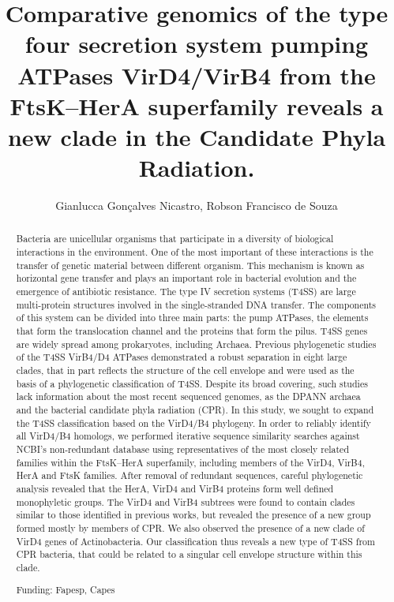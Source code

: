 \documentclass[twoside]{article}
\title{\vspace{-15mm}\fontsize{24pt}{10pt}\selectfont\textbf{ Comparative genomics of the type four secretion system pumping ATPases VirD4/VirB4 from the FtsK–HerA superfamily reveals a new clade in the Candidate Phyla Radiation. }} %
\author{ Gianlucca Gon\c{c}alves Nicastro, Robson Francisco de Souza }
\affil{  }
\date{}
\begin{document}
  
  
  \maketitle %
  
  
  \thispagestyle{fancy} %
  
  
  \begin{abstract}
  Bacteria are unicellular organisms that participate in a diversity of biological interactions in the environment. One of the most important of these interactions is the transfer of genetic material between different organism. This mechanism is known as horizontal gene transfer and plays an important role in bacterial evolution and the emergence of antibiotic resistance. The type IV secretion systems (T4SS) are large multi-protein structures involved in the single-stranded DNA transfer. The components of this system can be divided into three main parts: the pump ATPases,  the elements that form the translocation channel and the proteins that form the pilus. T4SS genes are widely spread among prokaryotes,  including Archaea. Previous phylogenetic studies of the T4SS VirB4/D4 ATPases demonstrated a robust separation in eight large clades,  that in part reflects the structure of the cell envelope and were used as the basis of a phylogenetic classification of T4SS. Despite its broad covering,  such studies lack information about the most recent sequenced genomes,  as the DPANN archaea and the bacterial candidate phyla radiation (CPR). In this study,  we sought to expand the T4SS classification based on the VirD4/B4 phylogeny. In order to reliably identify all VirD4/B4 homologs,  we performed iterative sequence similarity searches against NCBI’s non-redundant database using representatives of the most closely related families within the FtsK–HerA superfamily,  including members of the VirD4,  VirB4,  HerA and FtsK families. After removal of redundant sequences,  careful phylogenetic analysis revealed that the HerA,  VirD4 and VirB4 proteins form well defined monophyletic groups. The VirD4 and VirB4 subtrees were found to contain clades similar to those identified in previous works,  but revealed the presence of a new group formed mostly by members of CPR. We also observed the presence of a new clade of VirD4 genes of Actinobacteria. Our classification thus reveals a new type of T4SS from CPR bacteria,  that could be related to a singular cell envelope structure within this clade.
  
  Funding: Fapesp,  Capes \\ 
  \end{abstract}
  
\end{document}
